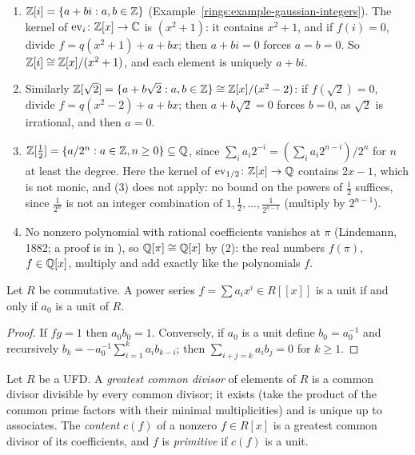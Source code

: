 \begin{example}\label{rings:example-adjoin}
\begin{enumerate}
\item $\mathbb{Z}[i] = \{a + bi : a, b \in \mathbb{Z}\}$ (Example~\ref{rings:example-gaussian-integers}). The kernel of $\mathrm{ev}_i \colon \mathbb{Z}[x] \to \mathbb{C}$ is $(x^2 + 1)$: it contains $x^2 + 1$, and if $f(i) = 0$, divide $f = q(x^2 + 1) + a + bx$; then
$a + bi = 0$ forces $a = b = 0$. So $\mathbb{Z}[i] \cong \mathbb{Z}[x]/(x^2 + 1)$, and each element is uniquely $a + bi$.
\item Similarly $\mathbb{Z}[\sqrt 2] = \{a + b\sqrt 2 : a, b \in \mathbb{Z}\} \cong \mathbb{Z}[x]/(x^2 - 2)$: if $f(\sqrt 2) = 0$, divide $f = q(x^2 - 2) + a + bx$; then $a + b\sqrt 2 = 0$ forces $b = 0$, as $\sqrt 2$ is irrational, and then $a = 0$.
\item $\mathbb{Z}[\frac12] = \{a/2^n : a \in \mathbb{Z}, n \geq 0\} \subseteq \mathbb{Q}$, since $\sum_ia_i2^{-i} = (\sum_ia_i2^{n-i})/2^n$ for $n$ at least the degree. Here the kernel of $\mathrm{ev}_{1/2} \colon \mathbb{Z}[x] \to \mathbb{Q}$ contains $2x - 1$,
which is not monic, and (3) does not apply: no bound on the powers of $\frac12$ suffices, since $\frac1{2^n}$ is not an integer combination of $1, \frac12, \ldots, \frac1{2^{n-1}}$ (multiply by $2^{n-1}$).
\item No nonzero polynomial with rational coefficients vanishes at $\pi$ (Lindemann, 1882; a proof is in \cite[Appendix 1]{lang-algebra}), so $\mathbb{Q}[\pi] \cong \mathbb{Q}[x]$ by (2): the real numbers $f(\pi)$, $f \in \mathbb{Q}[x]$, multiply
and add exactly like the polynomials $f$.
\end{enumerate}
\end{example}

\begin{proposition}\label{rings:proposition-power-series-units}
Let $R$ be commutative. A power series $f = \sum a_i x^i \in R[[x]]$ is a unit if and only if
$a_0$ is a unit of $R$.
\end{proposition}

\begin{proof}
If $fg = 1$ then $a_0 b_0 = 1$. Conversely, if $a_0$ is a unit define $b_0 = a_0^{-1}$
and recursively $b_k = -a_0^{-1}\sum_{i=1}^k a_i b_{k-i}$; then $\sum_{i+j=k} a_i b_j = 0$ for
$k \geq 1$.
\end{proof}

\begin{definition}\label{rings:definition-content}
Let $R$ be a UFD. A \emph{greatest common divisor} of elements of $R$ is a common
divisor divisible by every common divisor; it exists (take the product of the common
prime factors with their minimal multiplicities) and is unique up to associates. The
\emph{content} $c(f)$ of a nonzero $f \in R[x]$ is a greatest common divisor of its
coefficients, and $f$ is \emph{primitive} if $c(f)$ is a unit.
\end{definition}

